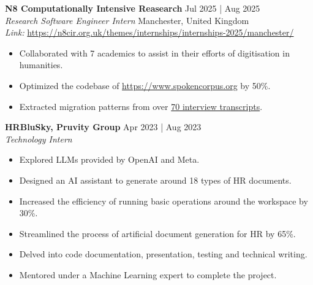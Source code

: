 \documentclass[a4paper,1.5pt]{extarticle}
\begin{document}
\textbf{N8 Computationally Intensive Reasearch} \hfill Jul 2025 | Aug 2025 \\ 
\textit{Research Software Engineer Intern} \hfill Manchester, United Kingdom \\ %
\textit{Link:} \url{https://n8cir.org.uk/themes/internships/internships-2025/manchester/}
\begin{itemize}
    \item Collaborated with 7 academics to assist in their efforts of digitisation in humanities.
    \item Optimized the codebase of \url{https://www.spokencorpus.org} by 50\%.
    \item Extracted migration patterns from over \href{https://conflictmemorymigration.manchester.ac.uk/interviews/}{70 interview transcripts}. 
\end{itemize}
\textbf{HRBluSky, Pruvity Group} \hfill Apr 2023 | Aug 2023 \\ %
\textit{Technology Intern}  %
\begin{itemize}
    \item Explored LLMs provided by OpenAI and Meta.  %
    \item Designed an AI assistant to generate around 18 types of HR documents.
    \item Increased the efficiency of running basic operations around the workspace by 30\%.
    \item Streamlined the process of artificial document generation for HR by 65\%.
    \item Delved into code documentation, presentation, testing and technical writing.
    \item Mentored under a Machine Learning expert to complete the project.
\end{itemize}


\end{document}
